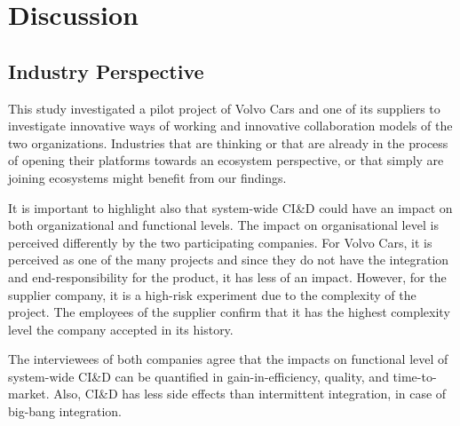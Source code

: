 \section{Discussion}\label{sec:discussion}



\subsection{Industry Perspective}

This study investigated a pilot project of Volvo Cars and one of its suppliers to investigate innovative ways of working and innovative collaboration models of the two organizations. Industries that are thinking or that are already in the process of opening their platforms towards an ecosystem perspective, or that simply are joining ecosystems might benefit from our findings.

It is important to highlight also that system-wide CI\&D could have an impact on both organizational and functional levels. 
%
%
The impact on organisational level is perceived differently by the two participating companies. For Volvo Cars, it is perceived as one of the many projects and since they do not have the integration and end-responsibility for the product, it has less of an impact. However, for the supplier company, it is a high-risk experiment due to the complexity of the project. The employees of the supplier confirm that it has the highest complexity level the company accepted in its history.

The interviewees of both companies agree that the impacts  on functional level of system-wide CI\&D %
can be quantified in gain-in-efficiency, quality, and time-to-market. Also, CI\&D has less side effects than intermittent integration, in case of big-bang integration.  

